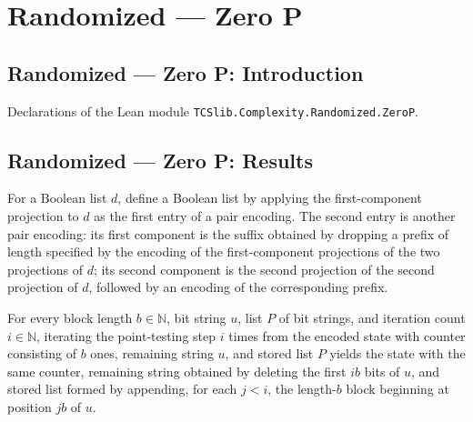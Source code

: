 \section{Randomized --- Zero P}
\subsection*{Randomized --- Zero P: Introduction}

Declarations of the Lean module \texttt{TCSlib.Complexity.Randomized.ZeroP}.

\subsection*{Randomized --- Zero P: Results}

\begin{definition}
\label{Randomized.PIT.ptStep}
\leanok
{}
For a Boolean list $d$, define a Boolean list by applying the first-component projection
to $d$ as the first entry of a pair encoding. The second entry is another pair encoding:
its first component is the suffix obtained by dropping a prefix of length specified by
the encoding of the first-component projections of the two projections of $d$; its
second component is the second projection of the second projection of $d$, followed by
an encoding of the corresponding prefix.
\end{definition}

\begin{theorem}
\label{Randomized.PIT.iterate_ptStep}
\leanok
{}
For every block length $b\in\mathbb{N}$, bit string $u$, list $P$ of bit strings, and
iteration count $i\in\mathbb{N}$, iterating the point-testing step $i$ times from the
encoded state with counter consisting of $b$ ones, remaining string $u$, and stored list
$P$ yields the state with the same counter, remaining string obtained by deleting the
first $ib$ bits of $u$, and stored list formed by appending, for each $j<i$, the
length-$b$ block beginning at position $jb$ of $u$.
\end{theorem}

